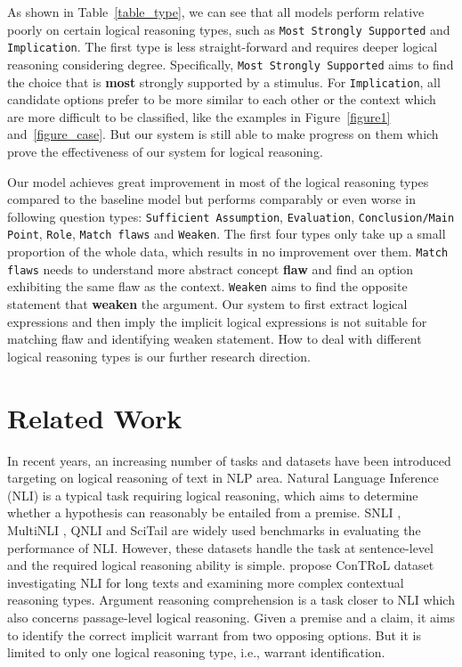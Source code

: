 \documentclass[11pt,a4paper]{article}
\begin{document}
As shown in Table~\ref{table_type}, we can see that all models perform relative poorly on certain logical reasoning types, such as \texttt{Most Strongly Supported} and \texttt{Implication}. The first type is less straight-forward and requires deeper logical reasoning considering degree. Specifically, \texttt{Most Strongly Supported} aims to find the choice that is \textbf{most} strongly supported by a stimulus. For \texttt{Implication}, all candidate options prefer to be more similar to each other or the context which are more difficult to be classified, like the examples in Figure~\ref{figure1} and~\ref{figure_case}. But our system is still able to make progress on them which prove the effectiveness of our system for logical reasoning.

Our model achieves great improvement in most of the logical reasoning types compared to the baseline model but performs comparably or even worse in following question types: \texttt{Sufficient Assumption}, \texttt{Evaluation}, \texttt{Conclusion/Main Point}, \texttt{Role}, \texttt{Match flaws} and \texttt{Weaken}. The first four types only take up a small proportion of the whole data, which results in no improvement over them. 
\texttt{Match flaws} needs to understand more abstract concept \textbf{flaw} and find an option exhibiting the same flaw as the context.
\texttt{Weaken} aims to find the opposite statement that \textbf{weaken} the argument.
Our system to first extract logical expressions and then imply the implicit logical expressions is not suitable for matching flaw and identifying weaken statement.
How to deal with different logical reasoning types is our further research direction.


\section{Related Work}
In recent years, an increasing number of tasks and datasets have been introduced targeting on logical reasoning of text in NLP area. Natural Language Inference (NLI) \cite{dagan2005pascal} is a typical task requiring logical reasoning, which aims to determine 
whether a hypothesis can reasonably be entailed from a premise. SNLI \cite{bowman2015large}, MultiNLI \cite{williams2018broad}, QNLI \cite{wang2018glue} and SciTail \cite{khot2018scitail} 
are widely used benchmarks in evaluating the performance of NLI. However, these datasets handle the task at sentence-level and the required logical reasoning ability is simple. \citet{liu2020natural} propose ConTRoL dataset investigating NLI for long texts and examining more complex contextual reasoning types. Argument reasoning comprehension \cite{habernal2018argument} is a task closer to NLI which also concerns passage-level logical reasoning. Given a premise and a claim, it aims to identify the correct implicit warrant from two opposing options. But it is limited to only one logical reasoning type, i.e., warrant identification. 
\end{document}
